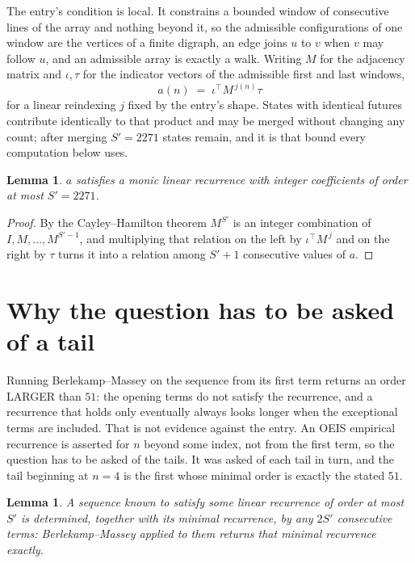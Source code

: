 \documentclass[11pt,a4paper]{article}
\theoremstyle{plain}
\newtheorem{lemma}[theorem]{Lemma}
\theoremstyle{definition}
\begin{document}
The entry's condition is local. It constrains a bounded window of consecutive lines of the
array and nothing beyond it, so the admissible configurations of one window are the vertices of
a finite digraph, an edge joins $u$ to $v$ when $v$ may follow $u$, and an admissible array is
exactly a walk. Writing $M$ for the adjacency matrix and $\iota,\tau$ for the indicator vectors
of the admissible first and last windows,
\[
a(n)\;=\;\iota^{\!\top}M^{\,j(n)}\tau
\]
for a linear reindexing $j$ fixed by the entry's shape. States with identical futures
contribute identically to that product and may be merged without changing any count; after
merging $S'=2271$ states remain, and it is that bound every computation below uses.

\begin{lemma}\label{lem:cf}
$a$ satisfies a monic linear recurrence with integer coefficients of order at most $S'=2271$.
\end{lemma}

\begin{proof}
By the Cayley--Hamilton theorem $M^{S'}$ is an integer combination of $I,M,\dots,M^{S'-1}$,
and multiplying that relation on the left by $\iota^{\!\top}M^{\,j}$ and on the right by
$\tau$ turns it into a relation among $S'+1$ consecutive values of $a$.
\end{proof}

\section{Why the question has to be asked of a tail}

Running Berlekamp--Massey on the sequence from its first term returns an order LARGER than $51$: the opening terms do not satisfy the recurrence, and a recurrence that holds only eventually always looks longer when the exceptional terms are included. That is not evidence against the entry. An OEIS empirical recurrence is asserted for $n$ beyond some index, not from the first term, so the question has to be asked of the tails. It was asked of each tail in turn, and the tail beginning at $n=4$ is the first whose minimal order is exactly the stated $51$.

\begin{lemma}\label{lem:bm}
A sequence known to satisfy some linear recurrence of order at most $S'$ is determined,
together with its minimal recurrence, by any $2S'$ consecutive terms: Berlekamp--Massey applied
to them returns that minimal recurrence exactly.
\end{lemma}
\end{document}
